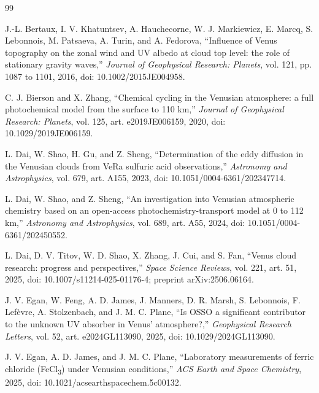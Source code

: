 
\begin{thebibliography}{99}

J.-L. Bertaux, I. V. Khatuntsev, A. Hauchecorne, W. J. Markiewicz, E. Marcq,
S. Lebonnois, M. Patsaeva, A. Turin, and A. Fedorova, ``Influence of Venus topography
on the zonal wind and UV albedo at cloud top level: the role of stationary gravity
waves,'' \emph{Journal of Geophysical Research: Planets}, vol. 121, pp. 1087 to 1101,
2016, doi: 10.1002/2015JE004958.

C. J. Bierson and X. Zhang, ``Chemical cycling in the Venusian atmosphere: a full
photochemical model from the surface to 110 km,'' \emph{Journal of Geophysical Research:
Planets}, vol. 125, art. e2019JE006159, 2020, doi: 10.1029/2019JE006159.

L. Dai, W. Shao, H. Gu, and Z. Sheng, ``Determination of the eddy diffusion in the
Venusian clouds from VeRa sulfuric acid observations,'' \emph{Astronomy and
Astrophysics}, vol. 679, art. A155, 2023, doi: 10.1051/0004-6361/202347714.

L. Dai, W. Shao, and Z. Sheng, ``An investigation into Venusian atmospheric chemistry
based on an open-access photochemistry-transport model at 0 to 112 km,''
\emph{Astronomy and Astrophysics}, vol. 689, art. A55, 2024,
doi: 10.1051/0004-6361/202450552.

L. Dai, D. V. Titov, W. D. Shao, X. Zhang, J. Cui, and S. Fan, ``Venus cloud research:
progress and perspectives,'' \emph{Space Science Reviews}, vol. 221, art. 51, 2025,
doi: 10.1007/s11214-025-01176-4; preprint arXiv:2506.06164.

J. V. Egan, W. Feng, A. D. James, J. Manners, D. R. Marsh, S. Lebonnois, F. Lef\`evre,
A. Stolzenbach, and J. M. C. Plane, ``Is OSSO a significant contributor to the unknown
UV absorber in Venus' atmosphere?,'' \emph{Geophysical Research Letters}, vol. 52,
art. e2024GL113090, 2025, doi: 10.1029/2024GL113090.

J. V. Egan, A. D. James, and J. M. C. Plane, ``Laboratory measurements of ferric
chloride (FeCl\textsubscript{3}) under Venusian conditions,'' \emph{ACS Earth and Space
Chemistry}, 2025, doi: 10.1021/acsearthspacechem.5c00132.


\end{thebibliography}
